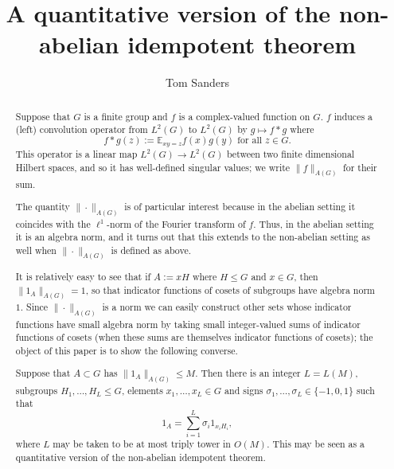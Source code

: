 \documentclass[12pt]{amsart}
\numberwithin{equation}{section}
\theoremstyle{plain}
\theoremstyle{definition}
\renewcommand{\leq}{\leqslant}
\newcommand{\E}{\mathbb{E}}
\begin{document}
\title[Quantitative version of non-abelian idempotent theorem]{A quantitative version of the non-abelian idempotent theorem}

\author{Tom Sanders}
\address{Department of Pure Mathematics and Mathematical Statistics\\
University of Cambridge\\
Wilberforce Road\\
Cambridge CB3 0WA\\
England } 


\begin{abstract}
Suppose that $G$ is a finite group and $f$ is a complex-valued function on $G$.  $f$ induces a (left) convolution operator from $L^2(G)$ to $L^2(G)$ by $g \mapsto f \ast g$ where
\begin{equation*}
 f \ast g(z):=\E_{xy=z}{f(x)g(y)} \textrm{ for all } z \in G.
\end{equation*}
This operator is a linear map $L^2(G) \rightarrow L^2(G)$ between two finite dimensional Hilbert spaces, and so it has well-defined singular values; we write $\|f\|_{A(G)}$ for their sum.

The quantity $\|\cdot\|_{A(G)}$ is of particular interest because in the abelian setting it coincides with the $\ell^1$-norm of the Fourier transform of $f$.  Thus, in the abelian setting it is an algebra norm, and it turns out that this extends to the non-abelian setting as well when $\|\cdot\|_{A(G)}$ is defined as above.

It is relatively easy to see that if $A:=xH$ where $H \leq G$ and $x \in G$, then $\|1_{A}\|_{A(G)} = 1$, so that indicator functions of cosets of subgroups have algebra norm $1$.  Since $\|\cdot\|_{A(G)}$ is a norm we can easily construct other sets whose indicator functions have small algebra norm by taking small integer-valued sums of indicator functions of cosets (when these sums are themselves indicator functions of cosets); the object of this paper is to show the following converse.

Suppose that $A \subset G$ has $\|1_A\|_{A(G)} \leq M$. Then there is an integer $L=L(M)$, subgroups $H_1,\dots,H_L \leq G$, elements $x_1,\dots,x_L \in G$ and signs $\sigma_1,\dots,\sigma_L \in \{-1,0,1\}$ such that
\begin{equation*}
1_A=\sum_{i=1}^L{\sigma_i1_{x_iH_i}},
\end{equation*}
where $L$ may be taken to be at most triply tower in $O(M)$.  This may be seen as a quantitative version of the non-abelian idempotent theorem.
\end{abstract}
\end{document}
